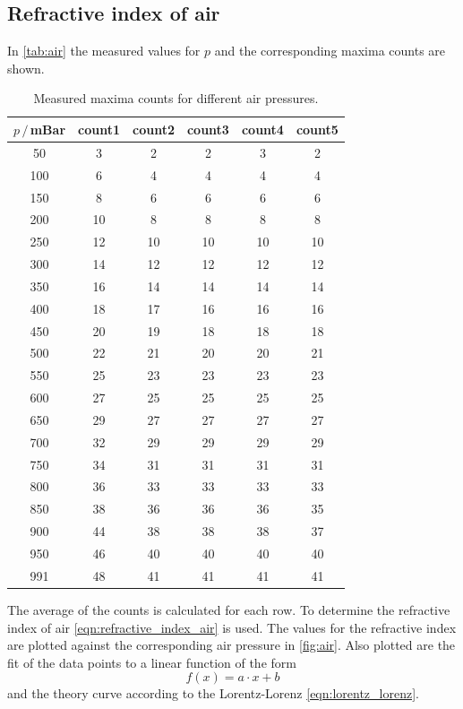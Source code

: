 \subsection{Refractive index of air}
In \autoref{tab:air} the measured values for $p$ and the corresponding maxima counts are shown.
\begin{table}[H]
  \centering
  \begin{tabular}{c|c|c|c|c|c}
  \hline
  $p\,/\,$mBar & count1 & count2 & count3 & count4 & count5 \\ \hline
  \hline
  50 & 3 & 2 & 2 & 3 & 2 \\ \hline
  100 & 6 & 4 & 4 & 4 & 4 \\ \hline
  150 & 8 & 6 & 6 & 6 & 6 \\ \hline
  200 & 10 & 8 & 8 & 8 & 8 \\ \hline
  250 & 12 & 10 & 10 & 10 & 10 \\ \hline
  300 & 14 & 12 & 12 & 12 & 12 \\ \hline
  350 & 16 & 14 & 14 & 14 & 14 \\ \hline
  400 & 18 & 17 & 16 & 16 & 16 \\ \hline
  450 & 20 & 19 & 18 & 18 & 18 \\ \hline
  500 & 22 & 21 & 20 & 20 & 21 \\ \hline
  550 & 25 & 23 & 23 & 23 & 23 \\ \hline
  600 & 27 & 25 & 25 & 25 & 25 \\ \hline
  650 & 29 & 27 & 27 & 27 & 27 \\ \hline
  700 & 32 & 29 & 29 & 29 & 29 \\ \hline
  750 & 34 & 31 & 31 & 31 & 31 \\ \hline
  800 & 36 & 33 & 33 & 33 & 33 \\ \hline
  850 & 38 & 36 & 36 & 36 & 35 \\ \hline
  900 & 44 & 38 & 38 & 38 & 37 \\ \hline
  950 & 46 & 40 & 40 & 40 & 40 \\ \hline
  991 & 48 & 41 & 41 & 41 & 41 \\ \hline
  \end{tabular}
  \caption{Measured maxima counts for different air pressures.}
  \label{tab:air}
\end{table}
The average of the counts is calculated for each row. To determine the refractive index of air
\autoref{eqn:refractive_index_air} is used. The values for the refractive index are plotted against
the corresponding air pressure in \autoref{fig:air}. Also plotted are the fit of the data points to a linear function of the form
\begin{equation}
  f(x) = a \cdot x + b
\end{equation}
and the theory curve according to the Lorentz-Lorenz \autoref{eqn:lorentz_lorenz}.


